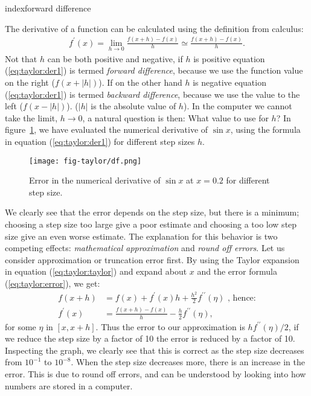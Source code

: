 \documentclass[graybox,sectrefs,envcountresetchap,open=right,final]{svmonodo}
\begin{document}
index{forward difference}


The derivative of a function can be calculated using the definition from calculus:
\begin{align}
f^\prime(x)=\lim_{h\to 0}\frac{f(x+h)-f(x)}{h}\simeq \frac{f(x+h)-f(x)}{h}.\label{eq:taylor:der1}
\end{align}  
Not that $h$ can be both positive and negative, if $h$ is positive equation (\ref{eq:taylor:der1}) is termed \emph{forward difference}, because we use the function value on the right ($f(x+|h|)$). If on the other hand $h$ is negative equation (\ref{eq:taylor:der1}) is termed \emph{backward difference}, because we use the value to the left ($f(x-|h|)$). ($|h|$ is the absolute value of $h$).
In the computer we cannot take the limit, $h\to 0$, a natural question is then: What value to use for $h$? 
In figure~\ref{fig:taylor:df}, we have evaluated the numerical derivative of $\sin x$, using the formula in equation (\ref{eq:taylor:der1}) for different step sizes $h$. 

\begin{figure}[!ht]  %
  \centerline{\texttt{[image: fig-taylor/df.png]}}
  \caption{
  Error in the numerical derivative of $\sin x$ at $x=0.2$ for different step size. \label{fig:taylor:df}
  }
\end{figure}



We clearly see that the error depends on the step size, but there is a minimum; choosing a step size too large give a poor estimate and choosing a too low step size give an 
even worse estimate. The explanation for this behavior is two competing effects: \emph{mathematical approximation} and \emph{round off errors}. Let us consider approximation or truncation error
first. By using the Taylor expansion in equation (\ref{eq:taylor:taylor}) and expand about $x$ and the error formula (\ref{eq:taylor:error}), we get:
\begin{align}
f(x+h)&=f(x)+f^\prime(x)h + \frac{h^2}{2}f^{\prime\prime}(\eta)\text{ , hence:}\nonumber\\ 
f^\prime(x)&=\frac{f(x+h)-f(x)}{h}-\frac{h}{2}f^{\prime\prime}(\eta),\label{eq:taylor:derr}
\end{align}
for some $\eta$ in $[x,x+h]$. Thus the error to our approximation is $hf^{\prime\prime}(\eta)/2$, if we reduce the step size by a factor of 10 the error is reduced by a factor of 10. 
Inspecting the graph, we clearly see that this is correct as the step size decreases from $10^{-1}$ to $10^{-8}$. When the step size decreases more, there is an increase in the error. This
is due to round off errors, and can be understood by looking into how numbers are stored in a computer.  
\end{document}
